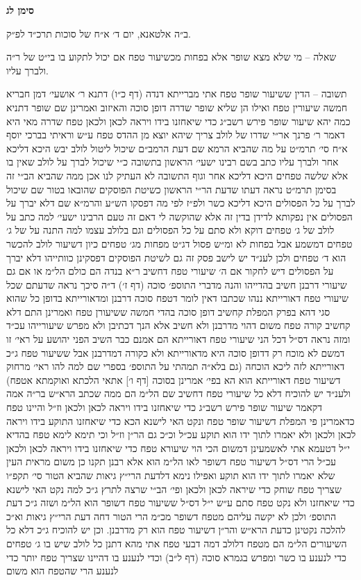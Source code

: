 \documentclass[12pt, openany]{book}
\newcommand{\chapname}{}
\newcommand{\newchap}[1]{
	\addcontentsline{toc}{chapter}{#1}
	\renewcommand{\chapname}{#1}
		\begin{center}
			\textbf{%
\fontsize{16pt}{16pt}\selectfont
				#1}
		\end{center}
}
\begin{document}
\newchap{סימן לג}
\begin{multicols}{2}
ב״ה אלטאנא, יום ד׳ א״ח של סוכות תרכ״ד לפ״ק.\\\vspace{0pt}

שאלה – מי שלא מצא שופר אלא בפחות מכשיעור טפח אם יכול לתקוע בו בי״ט של ר״ה ולברך עליו.\\\vspace{0pt}

תשובה – הדין ששיעור שופר טפח אתי מברייתא דנדה (דף כ״ו) דתנא ר׳ אושעי׳ דמן חבריא חמשה שיעורין טפח ואילו הן שליא שופר שדרה דופן סוכה והאיזוב ואמרינן שם שופר דתניא כמה יהא שיעור שופר פירש רשב״ג כדי שיאחזנו בידו ויראה לכאן ולכאן טפח שדרה מאי היא דאמר ר׳ פרנך אר״י שדרו של לולב צריך שיהא יוצא מן ההדס טפח ע״ש וראיתי בברכי יוסף א״ח סי׳ תרמ״ט על מה שהביא הרמא שם דעת הרמב״ם שיכול ליטול לולב יבש היכא דליכא אחר ולברך עליו כתב בשם רבינו ישעי׳ הראשון בתשובה כ״י שיכול לברך על לולב שאין בו אלא שלשה טפחים היכא דליכא אחר וגוף התשובה לא העתיק לנו אכן ממה שהביא הב״י זה בסימן תרמ״ט נראה דעתו שדעת הר״י הראשון כשיטת הפוסקים שהובאו בטור שם שיכול לברך על כל הפסולים היכא דליכא כשר ולפ״ז לפי מה דפסקו הש״ע והרמ״א שם דלא יברך על הפסולים אין נפקותא לדידן בדין זה אלא שהוקשה לי דאם זה טעם הרבינו ישעי׳ למה כתב על לולב של ג׳ טפחים דוקא ולא סתם על כל הפסולים וגם בלולב עצמו למה התנה על של ג׳ טפחים דמשמע אבל בפחות לא ומ״ש פסול דג״ט מפחות מג׳ טפחים כיון דשיעור לולב להכשר הוא ד׳ טפחים ולכן לענ״ד יש לישב פסק זה גם לשיטת הפוסקים דפסקינן כוותייהו דלא יברך על הפסולים דיש לחקור אם ה׳ שיעורי טפח דחשיב ר״א בנדה הם כולם הל״מ או אם גם שיעורי דרבנן חשיב בהדייהו והנה מדברי התוספ׳ סוכה (דף ז׳) ד״ה סיכך נראה שדעתם שכל שיעורי טפח דאורייתא ננהו שכתבו דאין לומר דטפח סוכה דרבנן ומדאורייתא בדופן כל שהוא סגי דהא בפרק המפלת קחשיב דופן סוכה בהדי חמשה ששיעורן טפח ואמרינן התם דלא קחשיב קורה טפח משום דהוי מדרבנן ולא חשיב אלא הנך דכתיבן ולא מפרש שיעורייהו עכ״ד ומזה נראה דס״ל דכל הני שיעורי טפח דאורייתא הם אמנם כבר השיב הפני יהושע על ראי׳ זו דמשם לא מוכח רק דדופן סוכה היא מדאורייתא ולא כקורה דמדרבנן אבל ששיעור טפח ג״כ דאורייתא לזה ליכא הוכחה (גם בלא״ה תמהתי על התוספ׳ בספרי שם למה להו ראי׳ מרחוק דשיעור טפח דאורייתא הוא הא בפי׳ אמרינן בסוכה [דף ו׳] אתאי הלכתא ואוקמתא אטפח) ולענ״ד יש להוכיח דלא כל שיעורי טפח דחשיב שם הל״מ הם ממה שכתב הרא״ש בר״ה אמה דקאמר שיעור שופר פירש רשב״ג כדי שיאחזנו בידו ויראה לכאן ולכאן וז״ל והיינו טפח כדאמרינן פי המפלת דשיעור שופר טפח ונקט האי לישנא הכא כדי שיאחזנו התוקע בידו ויראה לכאן ולכאן ולא יאמרו לתוך ידו הוא תוקע עכ״ל וכ״כ גם הר״ן וז״ל וכי תימא לימא טפח בהדיא י״ל דטעמא אתי לאשמעינן דמשום הכי הוי שיעורא טפח כדי שיאחזנו בידו ויראה לכאן ולכאן עכ״ל הרי דס״ל דשיעור טפח דשופר לאו הל״מ הוא אלא רבנן תקנו כן משום מראית העין שלא יאמרו לתוך ידו הוא תוקע ואפילו נימא דלדעת הרי״ץ גיאות שהביא הטור סי׳ תקפ״ו שצריך טפח שוחק כדי שיראה לכאן ולכאן ופי׳ הב״י שרצה לתרץ ג״כ למה נקט האי לישנא כדי שיאחזנו ולא נקט טפח סתם ע״ש י״ל דס״ל ששיעור טפח דשופר הוא הל״מ ושזה ג״כ דעת התוספ׳ ולכן לא יקשה עליהם מטפח דשופר מכ״מ הרי הטור דחה דעת הרי״ץ גיאות וא״כ להלכה נקטינן כדעת הרא״ש והר״ן דשיעור טפח הוא רק מדרבנן. וכן יש להוכיח ג״כ דלא כל השיעורים הל״מ הם מטפח דלולב דמה דבעי טפח אתי מהא דתנן כל לולב שיש בו ג׳ טפחים כדי לנענע בו כשר ומפרש בגמרא סוכה (דף ל״ב) וכדי לנענע בו דהיינו שצריך טפח יותר כדי לנענע הרי שהטפח הוא משום 
\end{multicols}
\end{document}
